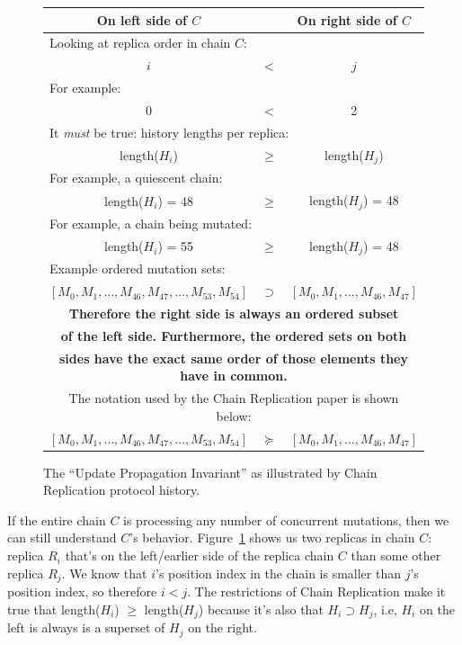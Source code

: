 \documentclass[preprint,10pt]{sigplanconf}
\begin{document}
\begin{figure}
\centering
\begin{tabular}{ccc}
{\bf {{On left side of $C$}}} & & {\bf On right side of $C$} \\
\hline
\multicolumn{3}{l}{Looking at replica order in chain $C$:} \\
$i$ & $<$ & $j$ \\

\multicolumn{3}{l}{For example:} \\

0 & $<$ & 2 \\
\hline
\multicolumn{3}{l}{It {\em must} be true: history lengths per replica:} \\
length($H_i$) & $\geq$ & length($H_j$) \\
\multicolumn{3}{l}{For example, a quiescent chain:} \\
length($H_i$) = 48 & $\geq$ & length($H_j$) = 48 \\
\multicolumn{3}{l}{For example, a chain being mutated:} \\
length($H_i$) = 55 & $\geq$ & length($H_j$) = 48 \\
\multicolumn{3}{l}{Example ordered mutation sets:} \\
$[M_0,M_1,\ldots,M_{46},M_{47},\ldots,M_{53},M_{54}]$ & $\supset$ & $[M_0,M_1,\ldots,M_{46},M_{47}]$ \\
\multicolumn{3}{c}{\bf Therefore the right side is always an ordered
  subset} \\
\multicolumn{3}{c}{\bf of the left side.  Furthermore, the ordered
  sets on both} \\
\multicolumn{3}{c}{\bf sides have the exact same order of those elements they have in common.} \\
\multicolumn{3}{c}{The notation used by the Chain Replication paper is
shown below:} \\
$[M_0,M_1,\ldots,M_{46},M_{47},\ldots,M_{53},M_{54}]$ & $\succeq$ & $[M_0,M_1,\ldots,M_{46},M_{47}]$ \\

\end{tabular}
\caption{The ``Update Propagation Invariant'' as
  illustrated by Chain Replication protocol history.}
\label{tab:chain-order}
\end{figure}

If the entire chain $C$ is processing any number of concurrent
mutations, then we can still understand $C$'s behavior.
Figure~\ref{tab:chain-order} shows us two replicas in chain $C$:
replica $R_i$ that's on the left/earlier side of the replica chain $C$
than some other replica $R_j$.  We know that $i$'s position index in
the chain is smaller than $j$'s position index, so therefore $i < j$.
The restrictions of Chain Replication make it true that length($H_i$)
$\ge$ length($H_j$) because it's also that $H_i \supset H_j$, i.e,
$H_i$ on the left is always is a superset of $H_j$ on the right.
\end{document}
